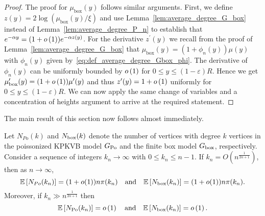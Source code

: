 \begin{proof}
The proof for $\mu_{\mathrm{box}}(y)$ follows similar arguments. First, we define $z(y) = 2 \log (\mu_{\mathrm{box}}(y)/\xi)$ and use Lemma~\ref{lem:average_degree_G_box} instead of Lemma~\ref{lem:average_degree_P_n} to establish that $e^{-\alpha y} = (1+o\left(1\right))e^{-\alpha z(y)}$. For the derivative $z^\prime(y)$ we recall from the proof of Lemma~\ref{lem:average_degree_G_box} that $\mu_{\mathrm{box}}(y) = (1 + \phi_n(y)) \mu(y)$ with $\phi_n(y)$ given by~\eqref{eq:def_average_degree_Gbox_phi}. The derivative of $\phi_n(y)$ can be uniformly bounded by $o\left(1\right)$ for $0 \le y \le (1-\varepsilon)R$. Hence we get $\mu_{\mathrm{box}}^\prime(y) = (1+o\left(1\right)) \mu^\prime(y)$ and thus $z^\prime(y) = 1 + o\left(1\right)$ uniformly for $0 \le y \le (1-\varepsilon)R$. We can now apply the same change of variables and a concentration of heights argument to arrive at the required statement.

\end{proof}

The main result of this section now follows almost immediately.

\begin{lemma}\label{lem:expnnkn}
Let $N_{Po}(k)$ and $N_{\text{box}}(k)$ denote the number of vertices with degree $k$ vertices in the poissonized KPKVB model $G_{{\mathrm{Po}}}$ and the finite box model $G_{\mathrm{box}}$, respectively. Consider a sequence of integers $k_n\rightarrow\infty$ with $0 \leq k_n \leq n-1$.	If $k_n = O\left(n^{\frac{1}{2\alpha+1}}\right)$, then as $n \to \infty$,
\[
	\mathbb{E}\left[N_{Po}(k_n)\right] =(1+o(1)) n {\pi}(k_n) \quad \text{and} \quad \mathbb{E}\left[N_{\text{box}}(k_n)\right] =(1+o(1)) n {\pi}(k_n).
\]
Moreover, if $k_n \gg n^{\frac{1}{2\alpha + 1}}$ then
\[
	\mathbb{E}\left[N_{{\mathrm{Po}}}(k_n)\right] = o\left(1\right) \quad \text{and} \quad \mathbb{E}\left[N_{\text{box}}(k_n)\right] = o\left(1\right).
\]
\end{lemma}

